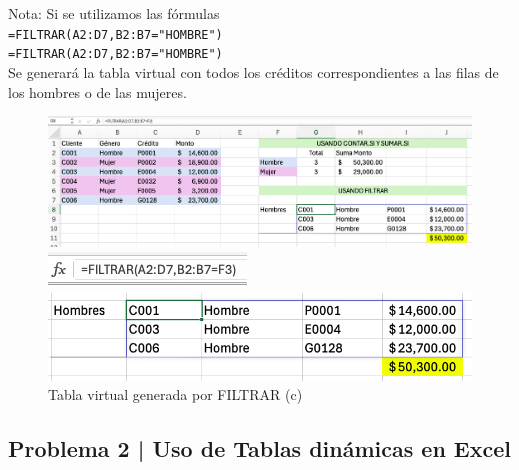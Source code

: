 \documentclass{article}
\begin{document}
\noindent
Nota: Si se utilizamos las fórmulas
\\[12pt]
\texttt{=FILTRAR(A2:D7,B2:B7="HOMBRE")}
\\[0pt]
\texttt{=FILTRAR(A2:D7,B2:B7="HOMBRE")}
\\[12pt]
Se generará la tabla virtual con todos los créditos correspondientes a las filas de los hombres o de las mujeres.
\begin{figure}[!h]
    \centering
    \begin{minipage}{\textwidth}
        \centering
        \includegraphics[width=\textwidth]{figures/s101-2.png}
    \end{minipage}
    \hfill
    \begin{minipage}{\textwidth}
        \centering
        \includegraphics[width=\textwidth]{figures/s101-3.png}
    \end{minipage}
    \hfill
    \begin{minipage}{\textwidth}
        \centering
        \includegraphics[width=\textwidth]{figures/s101-4.png}
    \end{minipage}
    \captionsetup{width=0.9\textwidth}
    \caption{Tabla virtual generada por FILTRAR (c)}
    \label{fig:s101-c}
\end{figure}

\clearpage

\subsection*{Problema 2 | Uso de Tablas dinámicas en Excel}
\end{document}
